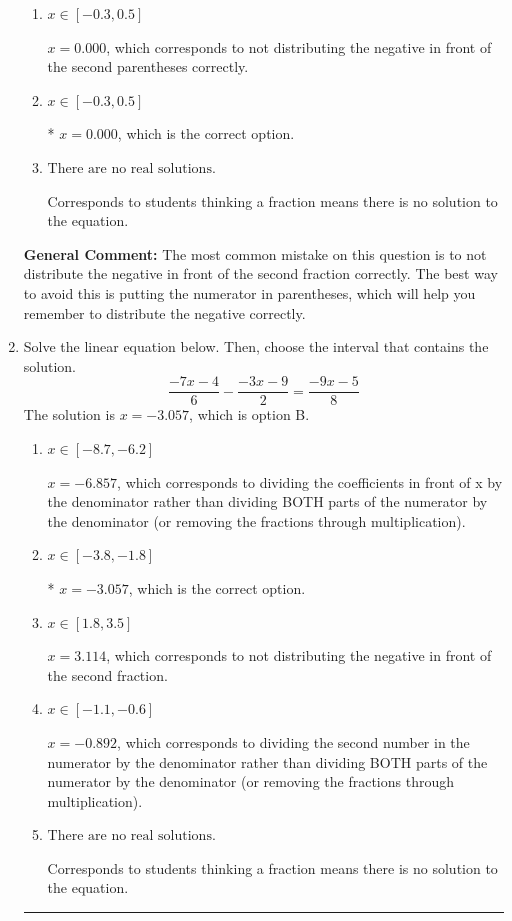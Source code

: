 \documentclass{extbook}[14pt]
\newcommand{\litem}[1]{\item #1

\rule{\textwidth}{0.4pt}}
\begin{document}
\begin{enumerate}
{\begin{enumerate}[label=\Alph*.]
$x = -1.036$, which corresponds to getting the negative of the actual solution.
\item \( x \in [-0.3, 0.5] \)

$x = 0.000$, which corresponds to not distributing the negative in front of the second parentheses correctly.
\item \( x \in [-0.3, 0.5] \)

* $x = 0.000$, which is the correct option.
\item \( \text{There are no real solutions.} \)

Corresponds to students thinking a fraction means there is no solution to the equation.
\end{enumerate}

\textbf{General Comment:} The most common mistake on this question is to not distribute the negative in front of the second fraction correctly. The best way to avoid this is putting the numerator in parentheses, which will help you remember to distribute the negative correctly.
}
\litem{
Solve the linear equation below. Then, choose the interval that contains the solution.
\[ \frac{-7x -4}{6} - \frac{-3x -9}{2} = \frac{-9x -5}{8} \]The solution is \( x = -3.057 \), which is option B.\begin{enumerate}[label=\Alph*.]
\item \( x \in [-8.7, -6.2] \)

 $x = -6.857$, which corresponds to dividing the coefficients in front of x by the denominator rather than dividing BOTH parts of the numerator by the denominator (or removing the fractions through multiplication).
\item \( x \in [-3.8, -1.8] \)

* $x = -3.057$, which is the correct option.
\item \( x \in [1.8, 3.5] \)

 $x = 3.114$, which corresponds to not distributing the negative in front of the second fraction.
\item \( x \in [-1.1, -0.6] \)

 $x = -0.892$, which corresponds to dividing the second number in the numerator by the denominator rather than dividing BOTH parts of the numerator by the denominator (or removing the fractions through multiplication).
\item \( \text{There are no real solutions.} \)

Corresponds to students thinking a fraction means there is no solution to the equation.
\end{enumerate}

}
\end{enumerate}
\end{document}

